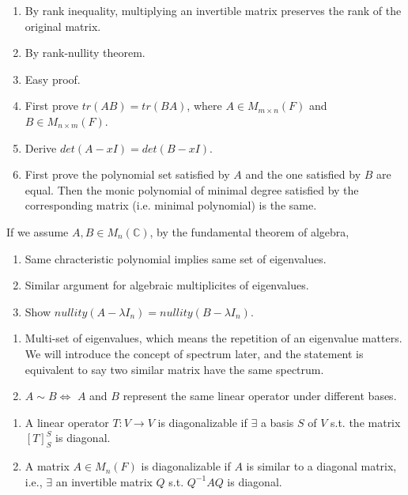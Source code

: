 \documentclass[12pt]{article}
\begin{document}
\begin{tcolorbox}[boxrule=0.5pt]
\begin{pf}
\begin{enumerate}
    \item By rank inequality, multiplying an invertible matrix preserves the rank of the original matrix.
    \item By rank-nullity theorem.
    \item Easy proof.
    \item First prove $tr(AB)=tr(BA)$, where $A\in M_{m\times n}(F)$ and $B\in M_{n\times m}(F)$.
    \item Derive $det(A-xI)=det(B-xI)$.
    \item First prove the polynomial set satisfied by $A$ and the one satisfied by $B$ are equal. Then the monic polynomial of minimal degree satisfied by the corresponding matrix (i.e. minimal polynomial) is the same.
\end{enumerate}

If we assume $A,B\in M_n(\mathbb{C})$, by the fundamental theorem of algebra,
\begin{enumerate}
    \item Same chracteristic polynomial implies same set of eigenvalues.
    \item Similar argument for algebraic multiplicites of eigenvalues.
    \item Show $nullity(A-\lambda I_n)=nullity(B-\lambda I_n)$.
\end{enumerate}

\end{pf}
\end{tcolorbox}


\begin{remark}
    \begin{enumerate}
        \item Multi-set of eigenvalues, which means the repetition of an eigenvalue matters. We will introduce the concept of spectrum later, and the statement is equivalent to say two similar matrix have the same spectrum.
        \item $A\sim B \Leftrightarrow$ $A$ and $B$ represent the same linear operator under different bases.
    \end{enumerate}
\end{remark}


\begin{definition}
    \begin{enumerate}
        \item A linear operator $T:V\rightarrow V$ is diagonalizable if $\exists$ a basis $S$ of $V$ s.t. the matrix $[T]^{S}_{S}$ is diagonal.
        \item A matrix $A\in M_n(F)$ is diagonalizable if $A$ is similar to a diagonal matrix, i.e., $\exists$ an invertible matrix $Q$ s.t. $Q^{-1}AQ$ is diagonal.
    \end{enumerate}
\end{definition}
\end{document}
